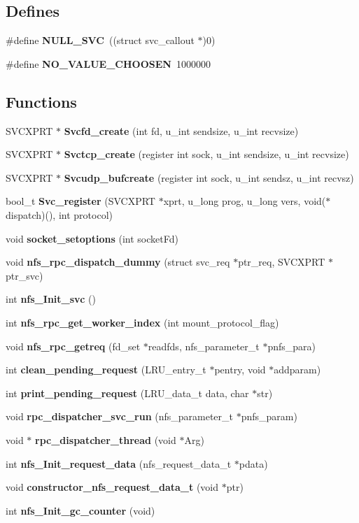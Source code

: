 \subsection*{Defines}
\begin{CompactItemize}
\item 
\#define {\bf NULL\_\-SVC}~((struct svc\_\-callout $\ast$)0)
\item 
\#define {\bf NO\_\-VALUE\_\-CHOOSEN}~1000000
\end{CompactItemize}
\subsection*{Functions}
\begin{CompactItemize}
\item 
SVCXPRT $\ast$ {\bf Svcfd\_\-create} (int fd, u\_\-int sendsize, u\_\-int recvsize)
\item 
SVCXPRT $\ast$ {\bf Svctcp\_\-create} (register int sock, u\_\-int sendsize, u\_\-int recvsize)
\item 
SVCXPRT $\ast$ {\bf Svcudp\_\-bufcreate} (register int sock, u\_\-int sendsz, u\_\-int recvsz)
\item 
bool\_\-t {\bf Svc\_\-register} (SVCXPRT $\ast$xprt, u\_\-long prog, u\_\-long vers, void($\ast$dispatch)(), int protocol)
\item 
void {\bf socket\_\-setoptions} (int socketFd)
\item 
void {\bf nfs\_\-rpc\_\-dispatch\_\-dummy} (struct svc\_\-req $\ast$ptr\_\-req, SVCXPRT $\ast$ptr\_\-svc)
\item 
int {\bf nfs\_\-Init\_\-svc} ()
\item 
int {\bf nfs\_\-rpc\_\-get\_\-worker\_\-index} (int mount\_\-protocol\_\-flag)
\item 
void {\bf nfs\_\-rpc\_\-getreq} (fd\_\-set $\ast$readfds, nfs\_\-parameter\_\-t $\ast$pnfs\_\-para)
\item 
int {\bf clean\_\-pending\_\-request} (LRU\_\-entry\_\-t $\ast$pentry, void $\ast$addparam)
\item 
int {\bf print\_\-pending\_\-request} (LRU\_\-data\_\-t data, char $\ast$str)
\item 
void {\bf rpc\_\-dispatcher\_\-svc\_\-run} (nfs\_\-parameter\_\-t $\ast$pnfs\_\-param)
\item 
void $\ast$ {\bf rpc\_\-dispatcher\_\-thread} (void $\ast$Arg)
\item 
int {\bf nfs\_\-Init\_\-request\_\-data} (nfs\_\-request\_\-data\_\-t $\ast$pdata)
\item 
void {\bf constructor\_\-nfs\_\-request\_\-data\_\-t} (void $\ast$ptr)
\item 
int {\bf nfs\_\-Init\_\-gc\_\-counter} (void)
\end{CompactItemize}
